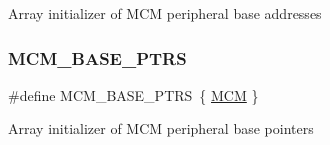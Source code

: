 Array initializer of M\+CM peripheral base addresses \mbox{\label{group___m_c_m___peripheral___access___layer_gae2d5e838ce7d2d4108738c05bf224272}} 
\subsubsection{\texorpdfstring{MCM\_BASE\_PTRS}{MCM\_BASE\_PTRS}}
{\footnotesize\ttfamily \#define M\+C\+M\+\_\+\+B\+A\+S\+E\+\_\+\+P\+T\+RS~\{ \mbox{\hyperlink{group___m_c_m___peripheral___access___layer_ga4cd2dcee5e786e36844ed653cfa40096}{M\+CM}} \}}

Array initializer of M\+CM peripheral base pointers 